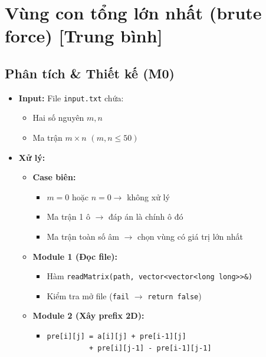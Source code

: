 \section{Vùng con tổng lớn nhất (brute force) [Trung bình]}
\subsection{Phân tích \& Thiết kế (M0)}
\begin{itemize}
    \item \textbf{Input:}
    File \texttt{input.txt} chứa:
    \begin{itemize}
        \item Hai số nguyên $m, n$
        \item Ma trận $m \times n$ $(m,n \le 50)$
    \end{itemize}

    \item \textbf{Xử lý:}
    \begin{itemize}
        \item \textbf{Case biên:}
        \begin{itemize}
            \item $m = 0$ hoặc $n = 0 \rightarrow$ không xử lý
            \item Ma trận 1 ô $\rightarrow$ đáp án là chính ô đó
            \item Ma trận toàn số âm $\rightarrow$ chọn vùng có giá trị lớn nhất
        \end{itemize}

        \item \textbf{Module 1 (Đọc file):}
        \begin{itemize}
            \item Hàm \texttt{readMatrix(path, vector<vector<long long>>\&)}
            \item Kiểm tra mở file (\texttt{fail} $\rightarrow$ \texttt{return false})
        \end{itemize}

        \item \textbf{Module 2 (Xây prefix 2D):}
        \begin{itemize}
            \item 
            \begin{lstlisting}
pre[i][j] = a[i][j] + pre[i-1][j]
          + pre[i][j-1] - pre[i-1][j-1]
            \end{lstlisting}
        \end{itemize}


\end{itemize}
\end{itemize}

